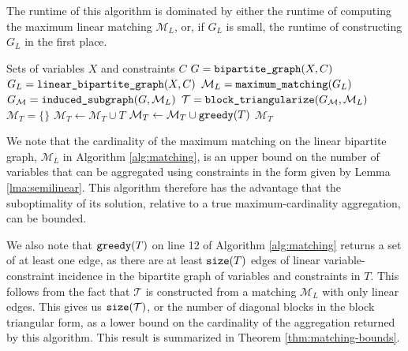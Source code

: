 \documentclass[smallextended]{svjour3}
\newcommand{\rev}[1]{{#1}}
\begin{document}
The runtime of this algorithm is dominated by either the runtime of computing the
maximum linear matching $\rev{\mathcal{M}}_L$, or, if $G_L$ is small, the runtime of constructing
$G_L$ in the first place.
\begin{algorithm}
  \caption{: {\tt linear\_matching\_aggregation\_set}}
  \begin{algorithmic}[1]
     Sets of variables $X$ and constraints $C$
    \State $G = \text{\tt bipartite\_graph}(X, C)$
    \State $G_L = \text{\tt linear\_bipartite\_graph}(X, C)$
    \State $\mathcal{M}_L = \text{\tt maximum\_matching}(G_L)$
    \State $G_\mathcal{M} = \text{\tt induced\_subgraph}(G, \mathcal{M}_L)$
    \State $\mathcal{T} = \text{\tt block\_triangularize}(G_\mathcal{M}, \mathcal{M}_L)$
    \State $\mathcal{M}_T = \{\}$
        \State $\mathcal{M}_T \gets \mathcal{M}_T \cup T$
      \Else                                      
        \State $\mathcal{M}_T \gets \mathcal{M}_T \cup \text{\tt greedy}(T)$
      \EndIf
    \EndFor
     $\mathcal{M}_T$
  \end{algorithmic}
  \label{alg:matching}
\end{algorithm}

We note that the cardinality of the maximum matching on the linear bipartite graph,
$\mathcal{M}_L$ in Algorithm \ref{alg:matching}, is an upper bound on the number
of variables that can be aggregated using constraints in the form given by
Lemma \ref{lma:semilinear}. This algorithm therefore has the advantage
that the suboptimality of its solution, relative to a true maximum-cardinality
aggregation, can be bounded.

We also note that $\text{\tt greedy}(T)$ on line 12 of Algorithm \ref{alg:matching}
returns a set of at least
one edge, as there are at least $\text{\tt size}(T)$ edges of linear variable-constraint
incidence in the bipartite graph of variables and constraints in $T$.
This follows from %
the fact that $\mathcal{T}$ is constructed from a matching $\mathcal{M}_L$ with only
linear edges.
This gives us $\text{\tt size}(\mathcal{T})$, or the number of diagonal blocks in
the block triangular form, as a lower bound on the cardinality of the aggregation
returned by this algorithm. This result is summarized in Theorem \ref{thm:matching-bounds}.
\end{document}
